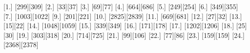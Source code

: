 [1.] [299][309]
[2.] [33][37]
[3.] [69][77]
[4.] [664][686]
[5.] [249][254]
[6.] [349][355]
[7.] [1003][1022]
[9.] [201][221]
[10.] [2825][2839]
[11.] [669][681]
[12.] [27][32]
[13.] [15][22]
[14.] [1048][1059]
[15.] [339][349]
[16.] [171][178]
[17.] [1202][1206]
[18.] [25][30]
[19.] [303][318]
[20.] [714][725]
[21.] [99][106]
[22.] [77][86]
[23.] [159][159]
[24.] [2368][2378]
